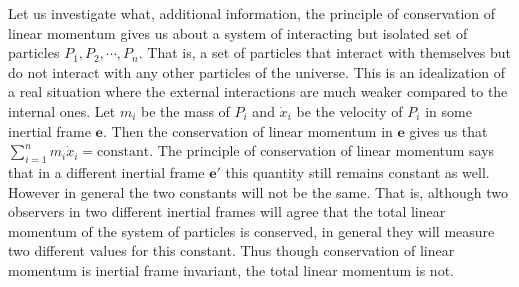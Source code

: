 \documentclass[graybox,envcountchap,sectrefs]{svmonoMuga}
\begin{document}
Let us investigate what, additional information, the principle of conservation of linear momentum gives us about a system of interacting but isolated set of particles $P_1,P_2,\cdots,P_n$. That is, a set of particles that interact with themselves but do not interact with any other particles of the universe. This is an idealization of a real situation where the external interactions are much weaker compared to the internal ones. Let $m_i$ be the mass of $P_i$ and $\dot{x}_i$ be the velocity of $P_i$ in some inertial frame $\mathbf{e}$. Then the conservation of linear momentum in $\mathbf{e}$ gives us that $\sum_{i=1}^{n}m_i\dot{x}_i=\mathrm{constant}$. The principle of conservation of linear momentum says that in a different inertial frame $\mathbf{e}'$ this quantity still remains constant as well. However in general the two constants will not be the same. That is, although two observers in two different inertial frames will agree that the total linear momentum of the system of particles is conserved, in general they will measure two different values for this constant. Thus though conservation of linear momentum is inertial frame invariant, the total linear momentum is not.
\end{document}
